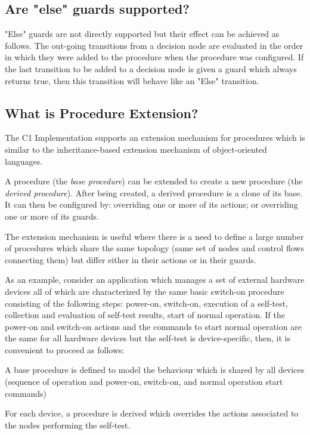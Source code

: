 \documentclass[a4paper,10pt]{article}
\newenvironment{fw_itemize}						%
{\begin{itemize}
  \setlength{\itemsep}{1mm}
  \setlength{\parskip}{0pt}
  \setlength{\parsep}{0pt}}
{\end{itemize}}
\begin{document}
\subsection{Are "else" guards supported?}
"Else" guards are not directly supported but their effect can be achieved as follows. The out-going transitions from a decision node are evaluated 
in the order in which they were added to the procedure when the procedure was configured. If the last transition to be added to a decision node is 
given a guard which always returns true, then this transition will behave like an "Else" transition.

\subsection{What is Procedure Extension?}\label{faq:PR_Extension}
The C1 Implementation supports an extension mechanism for procedures which is similar to the inheritance-based extension mechanism of object-oriented languages.

A procedure (the \emph{base procedure}) can be extended to create a new procedure (the \emph{derived procedure}). After being created, a derived procedure is 
a clone of its base. It can then be configured by: overriding one or more of its actions; or overriding one or more of its guards.

The extension mechanism is useful where there is a need to define a large number of procedures which share the same topology (same set of nodes and 
control flows connecting them) but differ either in their actions or in their guards.

As an example, consider an application which manages a set of external hardware devices all of which are characterized by the same basic switch-on 
procedure consisting of the following steps: power-on, switch-on, execution of a self-test, collection and evaluation of self-test results, 
start of normal operation. If the power-on and switch-on actions and the commands to start normal operation are the same for all hardware devices 
but the self-test is device-specific, then, it is convenient to proceed as follows:

\begin{fw_itemize} 
\item A base procedure is defined to model the behaviour which is shared by all devices (sequence of operation and power-on, switch-on, and normal operation start commands) 
\item For each device, a procedure is derived which overrides the actions associated to the nodes performing the self-test.
\end{fw_itemize}
\end{document}
